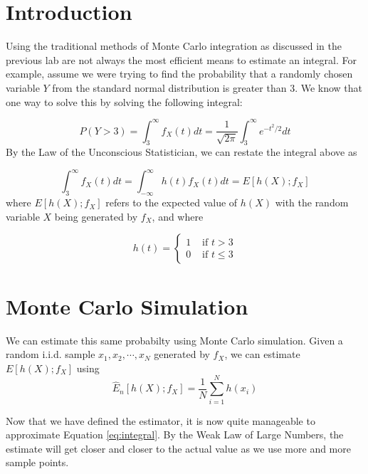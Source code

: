 \label{lab:montecarlo2}

\section*{Introduction}

Using the traditional methods of Monte Carlo integration as discussed in the previous lab are not always the most efficient means to estimate an integral. For example, assume we were trying to find the probability that a randomly chosen variable $Y$ from the standard normal distribution is greater than $3$. We know that one way to solve this by solving the following integral:

\begin{equation} \label{eq:integral} 
P(Y > 3) = \int_{3}^{\infty} f_X(t) dt = \frac{1}{\sqrt{2\pi}}\int_{3}^{\infty} e^{-t^2/2} dt
\end{equation}
By the Law of the Unconscious Statistician, we can restate the integral above as

\begin{equation*}
\int_{3}^{\infty} f_X(t) dt = \int_{-\infty}^{\infty} h(t)f_X(t) dt = E[h(X);f_X]
\end{equation*}
where $E[h(X);f_X]$ refers to the expected value of $h(X)$ with the random variable $X$ being generated by $f_X$, and where

$$h(t) = \begin{cases}
1 & \text{ if } t > 3 \\ 
0 & \text{ if } t \leq 3 
\end{cases} $$

\section*{Monte Carlo Simulation}
We can estimate this same probabilty using Monte Carlo simulation. 
Given a random i.i.d. sample $x_1, x_2, \cdots , x_N$ generated by $f_X$, we can estimate $E[h(X);f_X]$ using
\begin{equation} \label{eq:estimator}
\widehat{E}_n[h(X);f_X] = \frac{1}{N}\sum_{i = 1}^{N}h(x_i)
\end{equation}

Now that we have defined the estimator, it is now quite manageable to approximate Equation \ref{eq:integral}. By the Weak Law of Large Numbers, the estimate will get closer and closer to the actual value as we use more and more sample points.

